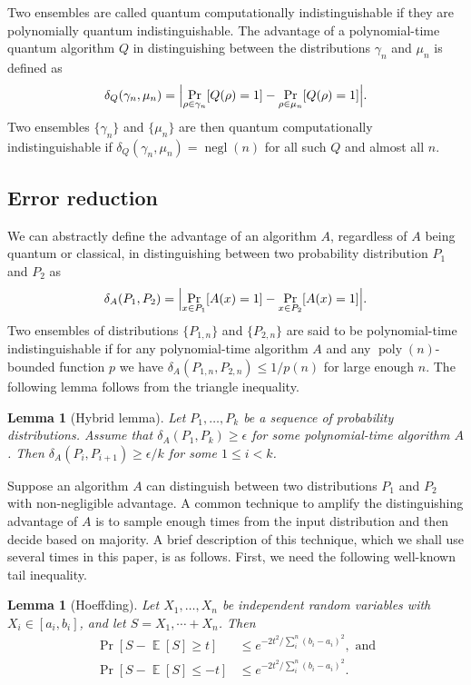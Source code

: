 \documentclass[11pt]{article}
\theoremstyle{plain}
\newtheorem{lemma}[theorem]{Lemma}
\theoremstyle{definition}
\DeclareMathOperator{\negl}{negl} %
\DeclareMathOperator{\poly}{poly}
\DeclareMathOperator{\E}{\mathbb{E}}
\DeclarePairedDelimiter{\abs}{\lvert}{\rvert}
\begin{document}
Two ensembles are called quantum computationally indistinguishable if they are polynomially quantum indistinguishable. The advantage of a polynomial-time quantum algorithm $Q$ in distinguishing between the distributions $\gamma_n$ and $\mu_n$ is defined as
\[ \delta_Q(\gamma_n, \mu_n) = \abs[\Big]{ \Pr_{\rho \in \gamma_n}[Q(\rho) = 1] - \Pr_{\rho \in \mu_n}[Q(\rho) = 1] }. \]
Two ensembles $\{ \gamma_n \}$ and $\{ \mu_n \}$ are then quantum computationally indistinguishable if $\delta_Q(\gamma_n, \mu_n) = \negl(n)$ for all such $Q$ and almost all $n$. 




\subsection{Error reduction}
\label{sec:err-red}

We can abstractly define the advantage of an algorithm $A$, regardless of $A$ being quantum or classical, in distinguishing between two probability distribution $P_1$ and $P_2$ as
\[ \delta_A(P_1, P_2) = \abs[\Big]{ \Pr_{x \in P_1}[A(x) = 1] - \Pr_{x \in P_2}[A(x) = 1] }. \]
Two ensembles of distributions $\{ P_{1, n} \}$ and $\{ P_{2, n} \}$ are said to be polynomial-time indistinguishable if for any polynomial-time algorithm $A$ and any $\poly(n)$-bounded function $p$ we have $\delta_A(P_{1, n}, P_{2, n}) \le 1 / p(n)$ for large enough $n$. The following lemma follows from the triangle inequality.

\begin{lemma}[Hybrid lemma]
    \label{lem:hybrid}
    Let $P_1, \dots, P_k$ be a sequence of probability distributions. Assume that $\delta_A(P_1, P_k) \ge \epsilon$ for some polynomial-time algorithm $A$. Then $\delta_A(P_i, P_{i + 1}) \ge \epsilon / k$ for some $1 \le i < k$.
\end{lemma}

Suppose an algorithm $A$ can distinguish between two distributions $P_1$ and $P_2$ with non-negligible advantage. A common technique to amplify the distinguishing advantage of $A$ is to sample enough times from the input distribution and then decide based on majority. A brief description of this technique, which we shall use several times in this paper, is as follows. First, we need the following well-known tail inequality.

\begin{lemma}[Hoeffding]
    \label{lem:hoeffding}
    Let $X_1, \dots, X_n$ be independent random variables with $X_i \in [a_i, b_i]$, and let $S = X_1, \cdots + X_n$. Then
    \begin{align*}
        \Pr[S - \E[S] \ge t] & \le e^{-2t^2 / \sum_i^n (b_i - a_i)^2}, \text{ and} \\
        \Pr[S - \E[S] \le -t] & \le e^{-2t^2 / \sum_i^n (b_i - a_i)^2}.
    \end{align*}
\end{lemma}
\end{document}
